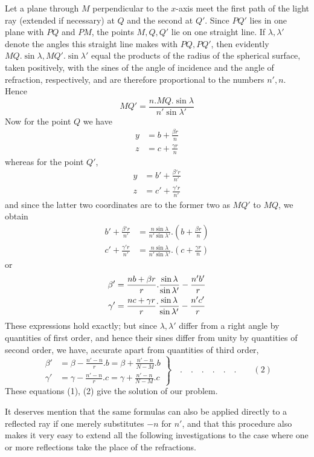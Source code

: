 Let a plane through $M$ perpendicular to the $x$-axis meet the first path of the light ray (extended if necessary) at $Q$ and the second at $Q'$. Since $PQ'$ lies in one plane with $PQ$ and $PM$, the points $M,Q,Q'$ lie on one straight line. If $\lambda,\lambda'$ denote the angles this straight line makes with $PQ,PQ'$, then evidently
$MQ.\sin\lambda,MQ'.\sin\lambda'$ equal the products of the radius of the spherical surface, taken positively, with the sines of the angle of incidence and the angle of refraction, respectively, and are therefore proportional to the numbers $n',n$. Hence
\[
MQ'=\frac{n.MQ.\sin\lambda}{n'\sin\lambda'}
\]
Now for the point $Q$ we have
\[
\begin{aligned}
y&=b+\frac{\beta r}n\\
z&=c+\frac{\gamma r}n
\end{aligned}
\]
whereas for the point $Q'$,
\[
\begin{aligned}
y&=b'+\frac{\beta'r}{n'}\\
z&=c'+\frac{\gamma'r}{n'}
\end{aligned}
\]
and since the latter two coordinates are to the former two as $MQ'$ to $MQ$, we obtain
\[
\begin{aligned}
b'+\frac{\beta'r}{n'}&=\frac{n\sin\lambda}{n'\sin\lambda'}.\left(b+\frac{\beta r}n\right)\\
c'+\frac{\gamma'r}{n'}&=\frac{n\sin\lambda}{n'\sin\lambda'}.\left(c+\frac{\gamma r}n\right)
\end{aligned}
\]
or
\[
\begin{aligned}
\beta'&=\frac{nb+\beta r}{r}.\frac{\sin\lambda}{\sin\lambda'}-\frac{n'b'}r\\
\gamma'&=\frac{nc+\gamma r}{r}\raisebox{0.55em}{.}\frac{\sin\lambda}{\sin\lambda'}-\frac{n'c'}r
\end{aligned}
\]
These expressions hold exactly; but since $\lambda,\lambda'$ differ from a right angle by quantities of first order, and hence their sines differ from unity by quantities of second order, we have, accurate apart from quantities of third order,
\[
\left.\begin{aligned}
\beta'&=\beta-\frac{n'-n}r.b=\beta+\frac{n'-n}{N-M}.b\\
\gamma'&=\gamma-\frac{n'-n}r.c=\gamma+\frac{n'-n}{N-M}.c
\end{aligned}\right\}\quad .\quad .\quad .\quad .\quad .\quad .\qquad(2)
\]
These equations (1), (2) give the solution of our problem.

It deserves mention that the same formulas can also be applied directly to a reflected ray if one merely substitutes $-n$ for $n'$, and that this procedure also makes it very easy to extend all the following investigations to the case where one or more reflections take the place of the refractions.

